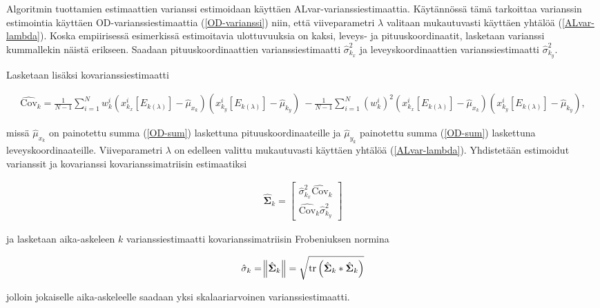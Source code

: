 \documentclass[
  12pt,
  a4paper, twoside]{book}
\begin{document}
Algoritmin tuottamien estimaattien varianssi estimoidaan käyttäen ALvar-varianssiestimaattia. Käytännössä tämä tarkoittaa varianssin estimointia käyttäen OD-varianssiestimaattia (\ref{OD-varianssi}) niin, että viiveparametri \(\lambda\) valitaan mukautuvasti käyttäen yhtälöä (\ref{ALvar-lambda}). Koska empiirisessä esimerkissä estimoitavia ulottuvuuksia on kaksi, leveys- ja pituuskoordinaatit, lasketaan varianssi kummallekin näistä erikseen. Saadaan pituuskoordinaattien varianssiestimaatti \(\hat{\sigma}^2_{k_x}\) ja leveyskoordinaattien varianssiestimaatti \(\hat{\sigma}^2_{k_y}\).

Lasketaan lisäksi kovarianssiestimaatti

\begin{align}\label{ALvar-kovarianssi}
\hat{\text{Cov}}_k = \frac{1}{N-1} \sum_{i=1}^N w_k^i (x_{k_{x}}^i[E_{k(\lambda)}]-\hat{\mu}_{x_k})(x_{k_y}^i[E_{k(\lambda)}]-\hat{\mu}_{k_y}) \ - \frac{1}{N-1} \sum_{i=1}^N (w_k^i)^2 (x_{k_{x}}^i[E_{k(\lambda)}]-\hat{\mu}_{x_k})(x_{k_y}^i[E_{k(\lambda)}]-\hat{\mu}_{k_y}),
\end{align}

\noindent missä \(\hat{\mu}_{x_k}\) on painotettu summa (\ref{OD-sum}) laskettuna pituuskoordinaateille ja \(\hat{\mu}_{y_k}\) painotettu summa (\ref{OD-sum}) laskettuna leveyskoordinaateille. Viiveparametri \(\lambda\) on edelleen valittu mukautuvasti käyttäen yhtälöä (\ref{ALvar-lambda}). Yhdistetään estimoidut varianssit ja kovarianssi kovarianssimatriisin estimaatiksi

\begin{align}\label{ALvar-kovarianssimatriisi}
\hat{\mathbf{\Sigma}}_k = \begin{bmatrix} \hat{\sigma}^2_{k_x} \hat{\text{Cov}}_k \\ \hat{\text{Cov}}_k \hat{\sigma}^2_{k_y} \end{bmatrix}
\end{align}

\noindent ja lasketaan aika-askeleen \(k\) varianssiestimaatti kovarianssimatriisin Frobeniuksen normina

\begin{align}\label{WB-varianssi}
\hat{\sigma}_k = \norm{ \hat{\mathbf{\Sigma}}_k } = \sqrt{ \text{tr}\left(\hat{\mathbf{\Sigma}}_k * \hat{\mathbf{\Sigma}}_k\right)}
\end{align}

\noindent jolloin jokaiselle aika-askeleelle saadaan yksi skalaariarvoinen varianssiestimaatti.
\end{document}
